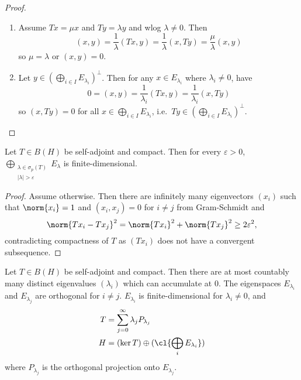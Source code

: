 \documentclass[a4paper]{article}
\begin{document}
\begin{proof}\leavevmode
  \begin{enumerate}
  \item Assume \(Tx = \mu x\) and \(Ty = \lambda y\) and wlog \(\lambda \neq 0\). Then
    \[
      (x, y)
      = \frac{1}{\lambda} (Tx, y)
      = \frac{1}{\lambda} (x, Ty)
      = \frac{\mu}{\lambda} (x, y)
    \]
    so \(\mu = \lambda\) or \((x, y) = 0\).
  \item Let \(y \in (\bigoplus_{i \in I} E_{\lambda_i})^\perp\). Then for any \(x \in E_{\lambda_i}\) where \(\lambda_i \neq 0\), have
    \[
      0
      = (x, y)
      = \frac{1}{\lambda_i} (Tx, y)
      = \frac{1}{\lambda_i} (x, Ty)
    \]
    so \((x, Ty) = 0\) for all \(x \in \bigoplus_{i \in I} E_{\lambda_i}\), i.e.\ \(Ty \in (\bigoplus_{i \in I} E_{\lambda_i})^\perp\).
  \end{enumerate}
\end{proof}

\begin{lemma}
  Let \(T \in B(H)\) be self-adjoint and compact. Then for every \(\varepsilon > 0\), \(\bigoplus_{\substack{\lambda \in \sigma_p(T) \\ |\lambda| > \varepsilon}} E_\lambda\) is finite-dimensional.
\end{lemma}

\begin{proof}
  Assume otherwise. Then there are infinitely many eigenvectors \((x_i)\) such that \(\norm{x_i} = 1\) and \((x_i, x_j) = 0\) for \(i \neq j\) from Gram-Schmidt and
  \[
    \norm{Tx_i - Tx_j}^2
    = \norm{Tx_i}^2 + \norm{Tx_j}^2
    \geq 2 \varepsilon^2,
  \]
  contradicting compactness of \(T\) as \((Tx_i)\) does not have a convergent subsequence.
\end{proof}

\begin{theorem}
  Let \(T \in B(H)\) be self-adjoint and compact. Then there are at most countably many distinct eigenvalues \((\lambda_i)\) which can accumulate at \(0\). The eigenspaces \(E_{\lambda_i}\) and \(E_{\lambda_j}\) are orthogonal for \(i \neq j\). \(E_{\lambda_i}\) is finite-dimensional for \(\lambda_i \neq 0\), and
  \begin{align*}
    T &= \sum_{j = 0}^\infty \lambda_jP_{\lambda_j} \\
    H &= (\ker T) \oplus (\cl{\bigoplus_i E_{\lambda_i}})
  \end{align*}
  where \(P_{\lambda_j}\) is the orthogonal projection onto \(E_{\lambda_j}\).
\end{theorem}
\end{document}
